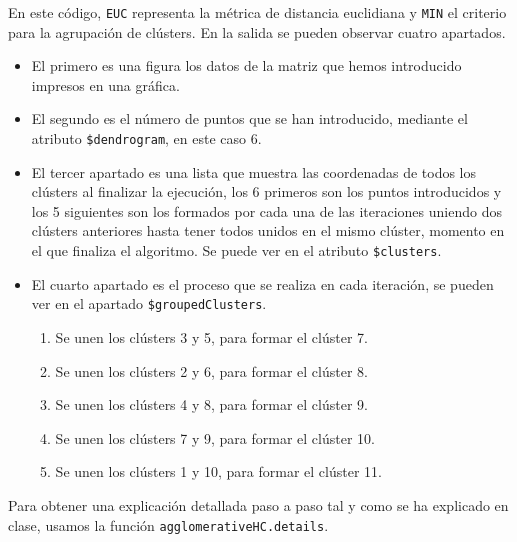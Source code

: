 \documentclass[12pt]{report}\usepackage[]{graphicx}\usepackage[dvipsnames]{xcolor}
\begin{document}
				En este código, \texttt{EUC} representa la métrica de distancia euclidiana y \texttt{MIN} el criterio para la agrupación de clústers. En la salida se pueden observar cuatro apartados.
				
				\begin{itemize}
					\item El primero es una figura los datos de la matriz que hemos introducido impresos en una gráfica.
					
					\item El segundo es el número de puntos que se han introducido, mediante el atributo \texttt{\$dendrogram}, en este caso 6.
					
					\item El tercer apartado es una lista que muestra las coordenadas de todos los clústers al finalizar la ejecución, los 6 primeros son los puntos introducidos y los 5 siguientes son los formados por cada una de las iteraciones uniendo dos clústers anteriores hasta tener todos unidos en el mismo clúster, momento en el que finaliza el algoritmo. Se puede ver en el atributo \texttt{\$clusters}.
					
					\item El cuarto apartado es el proceso que se realiza en cada iteración, se pueden ver en el apartado \texttt{\$groupedClusters}.
					
					\begin{enumerate}[label = \textbf{\arabic*.}]
						\item Se unen los clústers 3 y 5, para formar el clúster 7.
						\item Se unen los clústers 2 y 6, para formar el clúster 8.
						\item Se unen los clústers 4 y 8, para formar el clúster 9.
						\item Se unen los clústers 7 y 9, para formar el clúster 10.
						\item Se unen los clústers 1 y 10, para formar el clúster 11.
					\end{enumerate}
					
				\end{itemize}
				
				Para obtener una explicación detallada paso a paso tal y como se ha explicado en clase, usamos la función \texttt{agglomerativeHC.details}.
				
\end{document}
